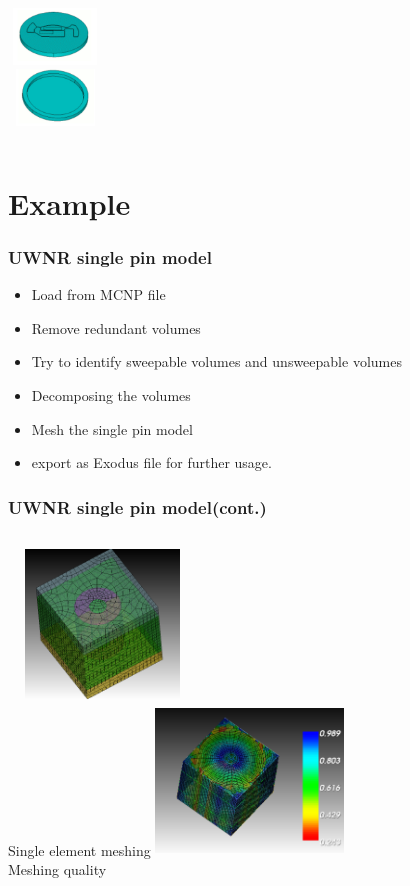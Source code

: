 \documentclass[fleqn]{beamer}
\begin{document}
\begin{frame}
\begin{columns}[t]
 \centering
 \includegraphics[width=2.5cm,height=1.5cm]{figures/s5.png}\\
 \includegraphics[width=2.5cm,height=1.5cm]{figures/t5.png}\\
 \end{columns}
 \end{frame} 

\section{Example}
\begin{frame}
 \frametitle {UWNR single pin model}
 \begin{itemize}
  \item Load from MCNP file
  \item Remove redundant volumes
  \item Try to identify sweepable volumes and unsweepable volumes
  \item Decomposing the volumes
  \item Mesh the single pin model
  \item export as Exodus file for further usage.
 \end{itemize}
 \end{frame}
 
  \begin{frame}
 \frametitle{UWNR single pin model(cont.)}
 \begin{columns}[t]
 \centering
 \includegraphics[width=5cm,height=4cm]{figures/single_element_meshing.png}\\{Single element meshing}
 \centering
 \includegraphics[width=5cm,height=4cm]{figures/single_element_mesh_quality.png}\\{Meshing quality}
 \end{columns}
 \end{frame}
\end{document}
